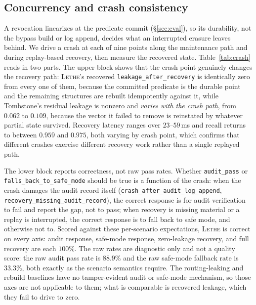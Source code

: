 \documentclass[sigconf, nonacm, review]{acmart}
\begin{document}
\subsection{Concurrency and crash consistency}
\label{app:crash}
A revocation linearizes at the predicate commit (\S\ref{sec:eval}), so its
durability, not the bypass build or log append, decides what an interrupted
erasure leaves behind. We drive a crash at each of nine points along the
maintenance path and during replay-based recovery, then measure the recovered
state. Table~\ref{tab:crash} reads in two parts. The upper block shows that the
crash point genuinely changes the recovery path: \textsc{Lethe}'s recovered
\texttt{leakage\_after\_recovery} is identically zero from every one of them,
because the committed predicate is the durable point and the remaining
structures are rebuilt idempotently against it, while Tombstone's residual
leakage is nonzero and \emph{varies with the crash path}, from $0.062$ to
$0.109$, because the vector it failed to remove is reinstated by whatever partial
state survived. Recovery latency ranges over $23$--$59$\,ms and recall returns to
between $0.959$ and $0.975$, both varying by crash point, which confirms that
different crashes exercise different recovery work rather than a single replayed
path.

The lower block reports correctness, not raw pass rates. Whether
\texttt{audit\_pass} or \texttt{falls\_back\_to\_safe\_mode} should be true is a
function of the crash: when the crash damages the audit record itself
(\texttt{crash\_after\_audit\_log\_append}, \texttt{recovery\_missing\_audit\_record}),
the correct response is for audit verification to fail and report the gap, not to
pass; when recovery is missing material or a replay is interrupted, the correct
response is to fall back to safe mode, and otherwise not to. Scored against these
per-scenario expectations, \textsc{Lethe} is correct on every axis: audit
response, safe-mode response, zero-leakage recovery, and full recovery are each
$100\%$. The raw rates are diagnostic only and not a quality score: the raw audit
pass rate is $88.9\%$ and the raw safe-mode fallback rate is $33.3\%$, both
exactly as the scenario semantics require. The routing-leaking and rebuild
baselines have no tamper-evident audit or safe-mode mechanism, so those axes are
not applicable to them; what is comparable is recovered leakage, which they fail
to drive to zero.
\end{document}
